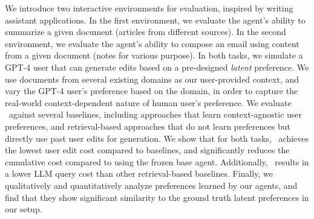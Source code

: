 We introduce two interactive environments for evaluation, inspired by writing assistant applications. In the first environment, we evaluate the agent's ability to summarize a given document (articles from different sources). In the second environment, we evaluate the agent's ability to compose an email using content from a given document (notes for various purpose). In both tasks, we simulate a GPT-4 user that can generate edits based on a pre-designed \emph{latent} preference. We use documents from several existing domains as our user-provided context, and vary the GPT-4 user's preference based on the domain, in order to capture the real-world context-dependent nature of human user's preference. We evaluate \algname~against several baselines, including approaches that learn context-agnostic user preferences, and retrieval-based approaches that do not learn preferences but directly use past user edits for generation. We show that for both tasks, \algname~achieves the lowest user edit cost compared to baselines, and significantly reduces the cumulative cost compared to using the frozen base agent. Additionally, \algname~results in a lower LLM query cost than other retrieval-based baselines.
Finally, we qualitatively and quantitatively analyze preferences learned by our agents, and find that they show significant similarity to the ground truth latent preferences in our setup.













